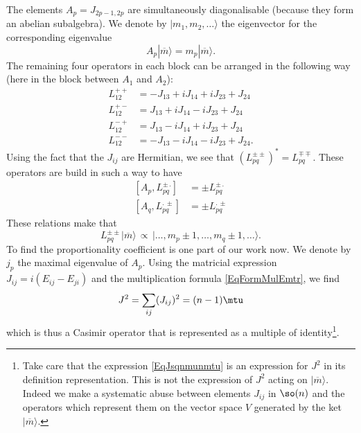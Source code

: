 The elements $A_p=J_{2p-1,2p}$ are simultaneously diagonalisable (because they form an abelian subalgebra). We denote by $| m_1,m_2,\ldots \rangle$ the eigenvector for the corresponding eigenvalue
\begin{equation}
	A_p| \overline{ m } \rangle=m_p| \overline{ m } \rangle.
\end{equation}
The remaining four operators in each block can be arranged in the following way (here in the block between $A_1$ and $A_2$):
\begin{subequations}		\label{subEqLppmmettouteca}
	\begin{align}
		L_{12}^{++}&=-J_{13}+iJ_{14}+iJ_{23}+J_{24}\\
		L_{12}^{+-}&=J_{13}+iJ_{14}-iJ_{23}+J_{24}\\
		L_{12}^{-+}&=J_{13}-iJ_{14}+iJ_{23}+J_{24}\\
		L_{12}^{--}&=-J_{13}-iJ_{14}-iJ_{23}+J_{24}.
	\end{align}
\end{subequations}
Using the fact that the $J_{ij}$ are Hermitian, we see that $(L_{pq}^{\pm\pm})^*=L_{pq}^{\mp\mp}$. These operators are build in such a way to have
\begin{subequations}		\label{SubEqCommsLppmmettoutca}
	\begin{align}
		[A_p,L_{pq}^{\pm\,.}]&=\pm L_{pq}^{\pm\,.}\\
		[A_q,L_{pq}^{.\,\pm}]&=\pm L_{pq}^{.\,\pm}
	\end{align}
\end{subequations}
These relations make that
\begin{equation}
	L_{pq}^{\pm\pm}| \overline{ m } \rangle\,\propto\, | \ldots,m_p\pm 1,\ldots,m_q\pm 1,\ldots \rangle.
\end{equation}
To find the proportionality coefficient is one part of our work now. We denote by $j_p$ the maximal eigenvalue of $A_p$. Using the matricial expression $J_{ij}=i(E_{ij}-E_{ji})$ and the multiplication formula \eqref{EqFormMulEmtr}, we find
\begin{equation}			\label{EqJsqnmunmtu}
	J^2=\sum_{ij}(J_{ij})^2=(n-1)\mtu
\end{equation}
which is thus a Casimir operator that is represented as a multiple of identity\footnote{Take care that the expression \eqref{EqJsqnmunmtu} is an expression for $J^2$ in its definition representation. This is not the expression of $J^2$ acting on $| \overline{ m } \rangle$. Indeed we make a systematic abuse between elements $J_{ij}$ in $\so(n)$ and the operators which represent them on the vector space $V$ generated by the ket $| \overline{ m } \rangle$.}.

